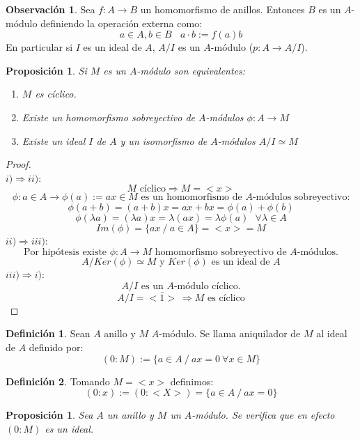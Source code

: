 \documentclass{article}
\theoremstyle{theorem-style}  %
\newtheorem{proposition}[theorem]{Proposición}
\theoremstyle{definition}
\newtheorem{definition}{Definición}[section]
\newtheorem*{observation}{Observación} %
\theoremstyle{example-style}
\begin{document}
\begin{observation}
	Sea $f:A\rightarrow B$ un homomorfismo de anillos. Entonces $B$ es un $A$-módulo definiendo la operación
	externa como:\[
		a\in A,b\in B \ \ \ \ a\cdot b :=f(a)b
	\]
	En particular si $I$ es un ideal de $A$, $A/I$ es un $A$-módulo ($p:A\rightarrow A/I$).
\end{observation}

\begin{proposition}
	Si $M$ es un $A$-módulo son equivalentes:
	\begin{enumerate}[\hspace{1cm}i)]
		\item $M$ es cíclico.
		\item Existe un homomorfismo sobreyectivo de $A$-módulos $\phi :A\rightarrow M$
		\item Existe un ideal $I$ de $A$ y un isomorfismo de $A$-módulos $A/I \simeq M$
	\end{enumerate}
\end{proposition}

\begin{proof} \ \\
	$i)\Rightarrow ii)$:
	\[ M \text{ cíclico}\Rightarrow M=<x>\]
	\[ \phi :a \in A\rightarrow \phi (a):=ax \in M \text{ es un homomorfismo de $A$-módulos sobreyectivo:}\]
	\[ \phi(a+b)=(a+b)x=ax+bx=\phi(a)+\phi(b)\]
	\[ \phi(\lambda a)=(\lambda a)x= \lambda(ax)=\lambda\phi(a) \ \ \ \forall\lambda\in A \]
	\[ Im(\phi)=\{ax \ / \ a\in A \} = <x>=M\]
	$ii)\Rightarrow iii)$:
	\[ \text{Por hipótesis existe } \phi:A\rightarrow M \text{ homomorfismo sobreyectivo de $A$-módulos.}\]
	\[ A/Ker(\phi) \simeq M \text{ y $Ker(\phi)$ es un ideal de } A \]
	$iii)\Rightarrow i)$:
	\[ A/I \text{ es un $A$-módulo cíclico.} \]
	\[ A/I=<\bar{1}>\ \Rightarrow\text{$M$ es cíclico} \]
\end{proof}

\begin{definition}
	Sean $A$ anillo y $M$ $A$-módulo. Se llama aniquilador de $M$ al ideal de $A$ definido por:
	\[(0:M):=\{a\in A \ / \ ax=0 \  \forall x \in M\}\]
\end{definition}

\begin{definition}
	Tomando $M=<x>$ definimos:
	\[(0:x):=(0:<X>)=\{a\in A \ / \ ax=0\}\]
\end{definition}

\begin{proposition}
	Sea $A$ un anillo y $M$ un $A$-módulo. Se verifica que en efecto $(0:M)$ es un ideal.
\end{proposition}
\end{document}
